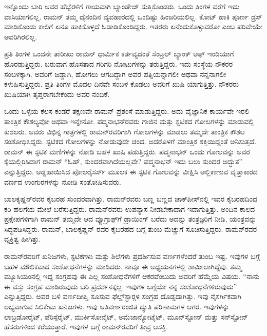 ಇನ್ನೊಂದು ಬಾರಿ ಅವರ ಹೆಬ್ಬೆರಳಿಗೆ ಗಾಯವಾಗಿ ಬ್ಯಾಂಡೇಜ್ ಸುತ್ತಿಕೊಂಡರು. ಒಂದು ತಿಂಗಳ ವರೆಗೆ ಇದು ವಾಸಿಯಾಗಲಿಲ್ಲ. ರಾಮನ್ ತಮ್ಮ ದೈನಂದಿನ ವ್ಯವಹಾರದಲ್ಲಿ ಒಂದಿಷ್ಟು ಹಿಂಜರಿಯಲಿಲ್ಲ. ಕೋಟ್ ಹಾಕಿ ಪೂರ್ಣ ಡ್ರಸ್ ಮಾಡಿಕೊಂಡು ಕಾಲಿಗೆ ಏನೂ ಹಾಕಿಕೊಳ್ಳದೆ ಓಡಾಡಿಕೊಂಡಿದ್ದರು. ಇತರರು ಏನೆಂದುಕೊಳ್ಳುವರೋ ಎಂಬ ಪರಿವೇಯೇ ಅವರಿಗಿರಲಿಲ್ಲ.

ಪ್ರತಿ ತಿಂಗಳ ಒಂದನೇ ತಾರೀಖು ರಾಮನ್ ಧಾರ್ಮಿಕ ಕರ್ತವ್ಯದಂತೆ ಸೆಂಟ್ರಲ್ ಬ್ಯಾಂಕ್ ಆಫ್ ಇಂಡಿಯಾಗೆ ಹೊರಡುತ್ತಿದ್ದರು. ಬರುವಾಗ ಹೊಸತಾದ ಗರಿಗರಿ ನೋಟುಗಳನ್ನು ತರುತ್ತಿದ್ದರು. ಇದು ಸಂಸ್ಥೆಯ ನೌಕರರ ಸಂಬಳಕ್ಕಾಗಿ. ಅವರಿಗೆ ಜಡ್ಡಾಗಿ, ಹೋಗಲು ಆಗದಿದ್ದಾಗ ಅವರ ಪತ್ನಿಯನ್ನಾಗಲೀ ಅಥವಾ ನನ್ನನಾಗಲೀ ಕಳುಹಿಸುತ್ತಿದ್ದರು. ಪ್ರತಿ ತಿಂಗಳ ಮೊದಲ ದಿನವೇ ಸಂಬಳ ಕೊಡಲು ಅವರಿಗೆ ಖುಷಿ ಯಾಗುತ್ತಿತ್ತು. ನೌಕರರು ಖುಷಿಯಾಗಿ ತೃಪ್ತರಾಗಬೇಕೆಂದು ಅವರ ನಂಬಿಕೆ.

ಒಂದು ಒಳ್ಳೆಯ ಕೆಲಸ ಕಂಡರೆ ತಕ್ಷಣವೇ ರಾಮನ್ ಪ್ರಶಂಸೆ ಮಾಡುತ್ತಿದ್ದರು. ಅದು ವೈಜ್ಞಾನಿಕ ಕಾರ್ಯವೇ ಇರಲಿ ತಾಂತ್ರಿಕ ಕೌಶಲ್ಯವೋ ಅಥವಾ ಇನ್ನೇನೋ. ಪದ್ಮನಾಭನ್‍ರವರು ಗಾಜಿನ ಮತ್ತು ಸ್ಫಟಿಕದ ಗೋಲಗಳನ್ನು ಮಾಡುವಲ್ಲಿ ಕುಶಲರು. ಅವರು ವಿಭಿನ್ನ ಗಾತ್ರಗಳಲ್ಲಿ ರಾಮನ್‍ರವರಿಗಾಗಿ ಗೋಲಗಳನ್ನು ಮಾಡಲು ತಮ್ಮದೇ ತಾಂತ್ರಿಕ ಕೌಶಲ ಸಂಶೋಧಿಸಿದ್ದರು. ಸ್ಫಟಿಕದ ಗೋಲಗಳನ್ನು ನೋಡುವುದೇ ಚಂದ. ಅದರೊಳಗೆ ಮಾಂತ್ರಿಕ ಶಕ್ತಿಯಿದ್ದಂತೆ ಅನಿಸುತ್ತದೆ. ರಾಮನ್ ಈ ಸ್ಫಟಿಕ ಮಣಿಗಳನ್ನು ನೋಡಿ ಬಹಳ ಖುಷಿ ಪಡುತ್ತಿದ್ದರು. ಪದ್ಮನಾಭನ್ ಒಂದು ಗೋಲವನ್ನು ಅವರ ಕೈಯಲ್ಲಿರಿಸಿದಾಗ ರಾಮನ್ “ಓಹ್, ಸುಂದರವಾಗಿದೆಯಲ್ಲವೇ? ಪದ್ಮನಾಭನ್ ಇದು ಬಲು ಸುಂದರ ಅದ್ಭುತ” ಎನ್ನುತ್ತಿದ್ದರು. ಅಡ್ಡಹಾಯಿಸಿದ ಪೋಲರೈಸರ್ಸ್ ಮೂಲಕ ಈ ಸ್ಫಟಿಕ ಗೋಲವನ್ನು ವೀಕ್ಷಿಸಿ ಅಲ್ಲಿಕಾಣುವ ವೃತ್ತಾಕಾರದ ವರ್ಣದ ಉಂಗುರಗಳನ್ನು ನೋಡಿ ಸಂತೋಷಿಸುವರು.

ಬಾಲಕೃಷ್ಣನ್‍ರವರ ಕೈಬರಹ ಸುಂದರವಾಗಿತ್ತು, ರಾಮನ್‍ರವರು ಬಣ್ಣ ಬಣ್ಣದ ಚಾಕ್‍ಪೀಸ್‍ನಲ್ಲಿ ಇವರ ಕೈಬರಹದಿಂದ ಕರಿ ಹಲಗೆಯ ಮೇಲೆ ಬರೆಸುತ್ತಿದ್ದರು. ರಾಮನ್‍ರವರು ಉಪನ್ಯಾಸ ನೀಡಬೇಕಾದಾಗ ಇದಾಗುತ್ತಿತ್ತು. ಅಂದಿನ ಕಾಲದ ಪ್ರಕ್ಷೇಪಗಳಿಗಾಗಿ ರಾಮನ್ ತಮ್ಮದೇ ಆದ ವ್ಯೂಗ್ರಾಫ್‍ಗೆ ಡ್ರಾಯಿಂಗ್ ಬರೆದು ಅದನ್ನು ತಂತ್ರಜ್ಞರಿಗೆ ನೀಡಿ, ಯಂತ್ರವನ್ನು ಸಿದ್ಧಪಡಿಸಿದ್ದರು. ರಾಮನ್, ಬಾಲಕೃಷ್ಣನ್ ರವರ ಕೈಬರಹದ ಬಗ್ಗೆ ತುಂಬ ಮೆಚ್ಚುಗೆ ಸೂಚಿಸುತ್ತಿದ್ದರು. ರಾಮನ್‍ರವರ ವ್ಯಕ್ತಿತ್ವ ಹೀಗಿತ್ತು.



ರಾಮನ್‍ರವರಿಗೆ ಖನಿಜಗಳು, ಸ್ಫಟಿಕಗಳು ಮತ್ತು ಶಿಲೆಗಳು ಪ್ರದರ್ಶಿಸುವ ವರ್ಣಗಳೆಂದರೆ ತುಂಬ ಇಷ್ಟ. ಇವುಗಳ ಬಗ್ಗೆ ಬಹಳ ಮೌಲಿಕವಾದ ಸಂಶೋಧನೆಗಳನ್ನು ಮಾಡಿದರು. ನಾವೂ ಈ ಅಧ್ಯಯನಗಳಲ್ಲಿ ಶಾಮೀಲಾಗಿದ್ದೆವು. ತಮ್ಮ ಮ್ಯೂಸಿಯಂನಲ್ಲಿ ಇದ್ದ ಸಂಗ್ರಹವು ಈ ಎಲ್ಲ ಸಂಶೋಧನೆಗಳಿಗೆ ಆಕರವೆಂಬುದು ಅವರಿಗೆ ಹೆಮ್ಮೆಯ ವಿಷಯ. “ನಾನು ಈ ವಸ್ತು ಸಂಗ್ರಹ ಮಾಡಿರುವುದು ಬರಿ ಪ್ರದರ್ಶನಕ್ಕಲ್ಲ. ಇವುಗಳ ಬಗ್ಗೆಯೇ ನನ್ನ ಸಂಶೋಧನೆಗಳಿರುವುದು” ಎನ್ನುತ್ತಿದ್ದರು. ಅವರ ಬಳಿ ವರ್ಣದೀಪ್ತಿ ಸೂಸುವ ಫೆಲ್ಡ್‌ಸ್ಟಾರ್‍ಗಳ ಸಂಗ್ರಹ ದೊಡ್ಡದಾಗಿತ್ತು. ಇವು ನೈಸರ್ಗಿಕವಾಗಿ ಲಭ್ಯವಾಗುವ ಸಿಲಿಕೇಟು ಖನಿಜಗಳು. ಇವು ಅತಿವರ್ಣರಂಜಿತ ದ್ಯುತಿ ಪರಿಣಾಮಗಳ ಆಗರ. ಇವುಗಳನ್ನು ಲಾಬ್ರಡೋರೈಟ್, ಪೆರಿಸ್ಪೆರೈಟ್, ಮುರ್ಕಿಸೋನೈಟ್, ಅಮೆಜಾನ್ಯೋಟೈಟ್, ಮೂನ್‍ಸ್ಟೋನ್ ಮತ್ತು ಸನ್‍ಸ್ಟೋನ್ ಹೆಸರುಗಳಿಂದ ಕರೆಯುತ್ತಾರೆ. ಇವುಗಳ ಬಗ್ಗೆ ರಾಮನ್‍ರವರಿಗೆ ತೀವ್ರ ಆಸಕ್ತಿ.

